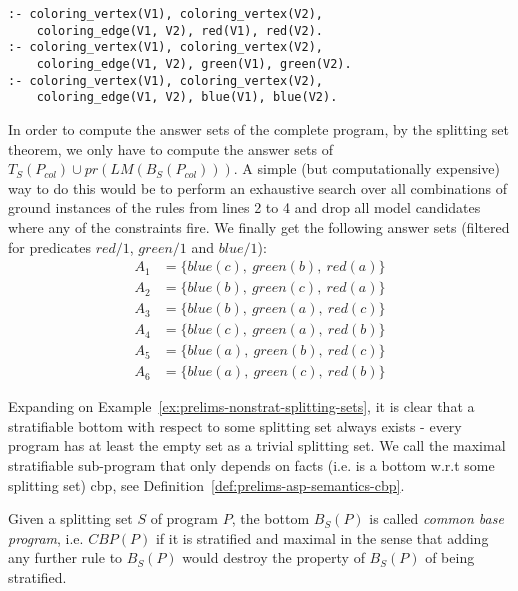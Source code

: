 \begin{example}
\begin{lstlisting}[style=asp-code, label={lst:prelims-3col-var-top}, caption={The top part of $P_{col}$}]
% Filter invalid guesses
:- coloring_vertex(V1), coloring_vertex(V2), 
	coloring_edge(V1, V2), red(V1), red(V2).
:- coloring_vertex(V1), coloring_vertex(V2), 
	coloring_edge(V1, V2), green(V1), green(V2).
:- coloring_vertex(V1), coloring_vertex(V2), 
	coloring_edge(V1, V2), blue(V1), blue(V2).
\end{lstlisting}	
In order to compute the answer sets of the complete program, by the splitting set theorem, we only have to compute the answer sets of $T_S(P_{col}) \cup pr(LM(B_S(P_{col})))$. A simple (but computationally expensive) way to do this would be to perform an exhaustive search over all combinations of ground instances of the rules from lines 2 to 4 and drop all model candidates where any of the constraints fire.
We finally get the following answer sets (filtered for predicates $red/1$, $green/1$ and $blue/1$):
\begin{align*}
	A_1 &= \{blue(c),~green(b),~red(a)\}\\
	A_2 &= \{blue(b),~green(c),~red(a)\}\\
	A_3 &= \{blue(b),~green(a),~red(c)\}\\
	A_4 &= \{blue(c),~green(a),~red(b)\}\\
	A_5 &= \{blue(a),~green(b),~red(c)\}\\
	A_6 &= \{blue(a),~green(c),~red(b)\}
\end{align*}	
\end{example}	

Expanding on Example~\ref{ex:prelims-nonstrat-splitting-sets}, it is clear that a stratifiable bottom with respect to some splitting set always exists - every program has at least the empty set as a trivial splitting set. We call the maximal stratifiable sub-program that only depends on facts (i.e. is a bottom w.r.t some splitting set) \gls{cbp}, see Definition~\ref{def:prelims-asp-semantics-cbp}.

\begin{definition}
\label{def:prelims-asp-semantics-cbp}
Given a splitting set $S$ of program $P$, the bottom $B_S(P)$ is called \emph{common base program}, i.e. $CBP(P)$ if it is stratified and maximal in the sense that adding any further rule to $B_S(P)$ would destroy the property of $B_S(P)$ of being stratified.
\end{definition}

